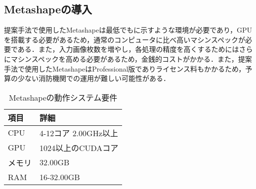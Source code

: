     \subsection*{Metashapeの導入}
      提案手法で使用したMetashapeは最低でもに示すような環境が必要であり，GPUを搭載する必要があるため，通常のコンピュータに比べ高いマシンスペックが必要である．また，入力画像枚数を増やし，各処理の精度を高くするためにはさらにマシンスペックを高める必要があるため，金銭的コストがかかる．また，提案手法で使用したMetashapeはProfessional版でありライセンス料もかかるため，予算の少ない消防機関での運用が難しい可能性がある．
      
      \begin{table}[t]
        \centering
        \caption{Metashapeの動作システム要件}
        \label{Metashapeの動作システム要件1}
        \begin{tabular}{ll}
          \hline
          \textbf{項目} & \textbf{詳細} \\
          \hline \hline
          CPU & 4-12コア 2.00GHz以上 \\
          GPU & 1024以上のCUDAコア \\
          メモリ & 32.00GB \\
          RAM & 16-32.00GB \\
        \end{tabular}
      \end{table}
